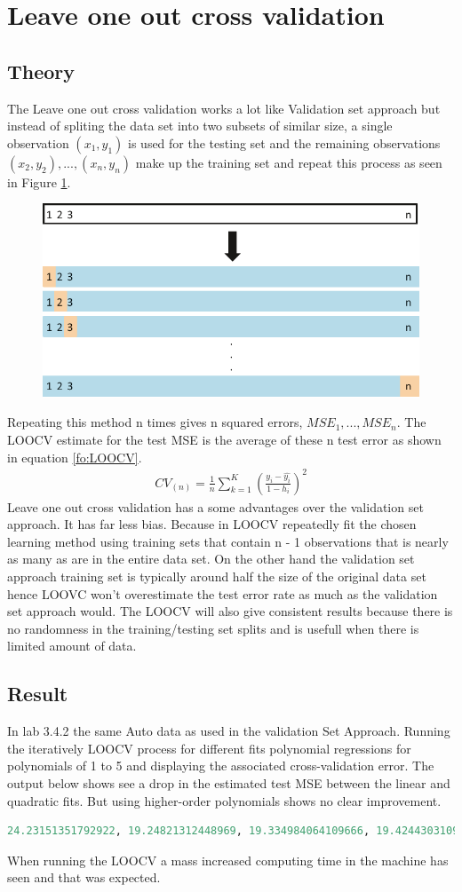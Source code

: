 \section {Leave one out cross validation}
\subsection{Theory}
The Leave one out cross validation works a lot like Validation set approach but instead of spliting the data set into two subsets of
similar size, a single observation $(x_1, y_1)$ is used for the testing set and the remaining observations ${(x_2, y_2), . . . , (x_n, y_n)}$ make up the training set and repeat this process as seen in Figure \ref{fig:loocv}.
\begin{figure}[H]
	\centering
	\includegraphics[width=0.5\linewidth]{crossValidation/LOOCV}
	\caption{}
	\label{fig:loocv}
\end{figure}
Repeating this method n times gives n squared errors, $MSE_1, . . . , MSE_n$. The LOOCV estimate for the test MSE is the average of these n test error as shown in equation \ref{fo:LOOCV}.
\begin{align}\label{fo:LOOCV}
CV_{(n)} = \frac {1}{n} \sum_{k=1}^{K}  (\frac {y_i-\hat{y_i}}{1- h_i})^2
\end{align}
Leave one out cross validation has a some advantages over the validation set approach. It has far less bias. Because in LOOCV repeatedly fit the chosen learning method using training sets that contain n - 1 observations that is nearly as many as are in the entire data set. On the other hand the validation set approach training set is typically around half the size of the original data set hence LOOVC won't overestimate the test error rate as much as the validation set approach would. The LOOCV will also give consistent results because there is no randomness in the training/testing set splits and is usefull when there is limited amount of data.

\subsection{Result}
In lab 3.4.2 the same Auto data as used in the validation Set Approach. Running the iteratively LOOCV process for different fits polynomial regressions for polynomials of 1 to 5 and displaying the associated cross-validation error. The output below shows see a drop in the estimated test MSE between the linear and quadratic fits. But using higher-order polynomials shows no clear improvement.
\begin{lstlisting}[language=Python]
24.23151351792922, 19.24821312448969, 19.334984064109666, 19.42443031091358, 19.0332089609506
\end{lstlisting}
When running the LOOCV a mass increased computing time in the machine has seen and that was expected.
